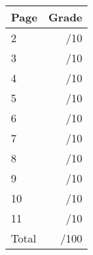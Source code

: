 \documentclass[12pt]{article}
\newcommand{\skipline}{\vspace{12pt}}
\begin{document}
\begin{table}[hbt]
\begin{center}
\begin{tabular}{|l|r|} \hline
Page&Grade\\
\hline \hline
\cline{1-2} 2 & \enspace\enspace\enspace\enspace\enspace\enspace/10\\
\cline{1-2} 3 & \enspace\enspace\enspace\enspace\enspace\enspace/10\\
\cline{1-2} 4 & \enspace\enspace\enspace\enspace\enspace\enspace/10\\
\cline{1-2} 5 & \enspace\enspace\enspace\enspace\enspace\enspace/10\\
\cline{1-2} 6 & \enspace\enspace\enspace\enspace\enspace\enspace/10\\
\cline{1-2} 7 & \enspace\enspace\enspace\enspace\enspace\enspace/10\\
\cline{1-2} 8 & \enspace\enspace\enspace\enspace\enspace\enspace/10\\
\cline{1-2} 9 & \enspace\enspace\enspace\enspace\enspace\enspace/10\\
\cline{1-2} 10 & \enspace\enspace\enspace\enspace\enspace\enspace/10\\
\cline{1-2} 11 & \enspace\enspace\enspace\enspace\enspace\enspace/10\\
\cline{1-2} Total & \enspace\enspace\enspace\enspace\enspace\enspace/100\\
\hline
\end{tabular}

\skipline

\skipline

\skipline


\end{center}
\end{table}
\newpage
\end{document}
